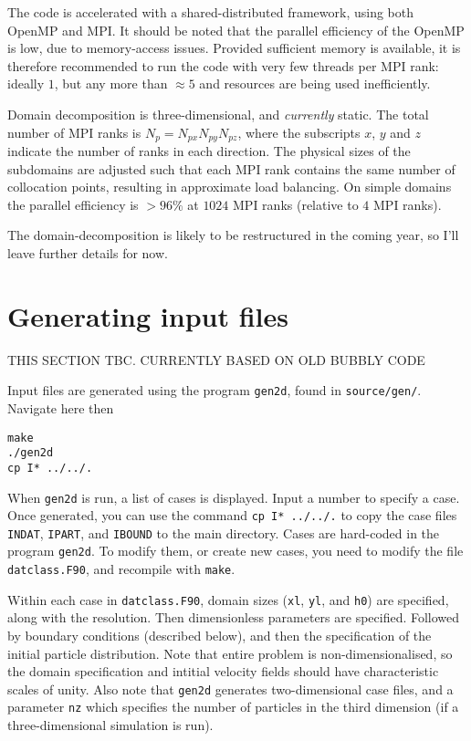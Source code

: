 \documentclass[notitlepage]{revtex4-1}
\begin{document}
The code is accelerated with a shared-distributed framework, using both OpenMP and MPI. It should be noted that the parallel efficiency of the OpenMP is low, due to memory-access issues. Provided sufficient memory is available, it is therefore recommended to run the code with very few threads per MPI rank: ideally $1$, but any more than $\approx{5}$ and resources are being used inefficiently.

Domain decomposition is three-dimensional, and \emph{currently} static. The total number of MPI ranks is $N_{p}=N_{px}N_{py}N_{pz}$, where the subscripts $x$, $y$ and $z$ indicate the number of ranks in each direction. The physical sizes of the subdomains are adjusted such that each MPI rank contains the same number of collocation points, resulting in approximate load balancing. On simple domains the parallel efficiency is $>96\%$ at $1024$ MPI ranks (relative to $4$ MPI ranks).

The domain-decomposition is likely to be restructured in the coming year, so I'll leave further details for now.

\section{Generating input files}


THIS SECTION TBC. CURRENTLY BASED ON OLD BUBBLY CODE

Input files are generated using the program \verb|gen2d|, found in \verb|source/gen/|. Navigate here then
\begin{verbatim}
make
./gen2d
cp I* ../../.
\end{verbatim}
When \verb|gen2d| is run, a list of cases is displayed. Input a number to specify a case. Once generated, you can use the command \verb|cp I* ../../.| to copy the case files \verb|INDAT|, \verb|IPART|, and \verb|IBOUND| to the main directory. Cases are hard-coded in the program \verb|gen2d|. To modify them, or create new cases, you need to modify the file \verb|datclass.F90|, and recompile with \verb|make|.

Within each case in \verb|datclass.F90|, domain sizes (\verb|xl|, \verb|yl|, and \verb|h0|) are specified, along with the resolution. Then dimensionless parameters are specified. Followed by boundary conditions (described below), and then the specification of the initial particle distribution. Note that entire problem is non-dimensionalised, so the domain specification and intitial velocity fields should have characteristic scales of unity. Also note that \verb|gen2d| generates two-dimensional case files, and a parameter \verb|nz| which specifies the number of particles in the third dimension (if a three-dimensional simulation is run).
\end{document}
